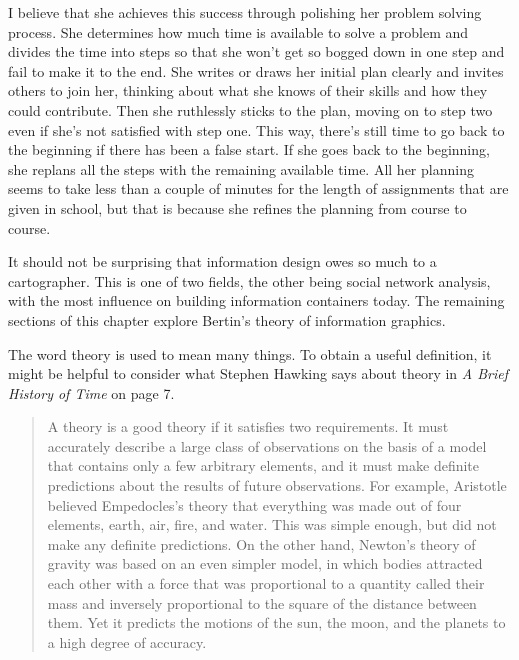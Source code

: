 I believe that she achieves this success through polishing her problem
solving process. She determines how much time is available to solve a
problem and divides the time into steps so that she won't get so bogged
down in one step and fail to make it to the end. She writes or draws her
initial plan clearly and invites others to join her, thinking about what
she knows of their skills and how they could contribute. Then she
ruthlessly sticks to the plan, moving on to step two even if she's not
satisfied with step one. This way, there's still time to go back to the
beginning if there has been a false start. If she goes back to the
beginning, she replans all the steps with the remaining available time.
All her planning seems to take less than a couple of minutes for the
length of assignments that are given in school, but that is because she
refines the planning from course to course.

\hypertarget{bertins-theory}{%
\label{bertins-theory}}

It should not be surprising that information design owes so much to a
cartographer. This is one of two fields, the other being social network
analysis, with the most influence on building information containers
today. The remaining sections of this chapter explore Bertin's theory of
information graphics.

\hypertarget{theories}{%
\label{theories}}

The word theory is used to mean many things. To obtain a useful
definition, it might be helpful to consider what Stephen Hawking says
about theory in \emph{A Brief History of Time} on page 7.

\begin{quotation}
A theory is a good theory if it satisfies two
requirements. It must accurately describe a large class
of observations on the basis of a model that contains
only a few arbitrary elements, and it must make definite
predictions about the results of future observations.
For example, Aristotle believed Empedocles's theory that
everything was made out of four elements, earth, air,
fire, and water. This was simple enough, but did not
make any definite predictions. On the other hand,
Newton's theory of gravity was based on an even simpler
model, in which bodies attracted each other with a force
that was proportional to a quantity called their mass
and inversely proportional to the square of the distance
between them. Yet it predicts the motions of the sun,
the moon, and the planets to a high degree of accuracy.
\end{quotation}

